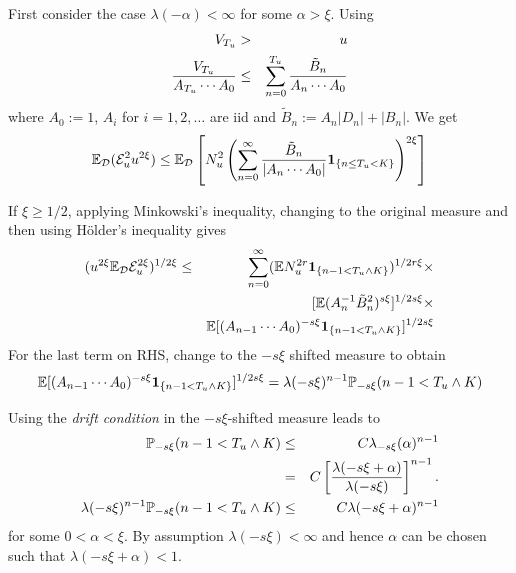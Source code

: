 \documentclass{beamer}
\begin{document}
\begin{frame}
  First consider the case $\lambda(-\alpha) < \infty$ for some $\alpha
  > \xi$. Using
  \begin{eqnarray*}
    V_{T_u} &>& u \\
    {V_{T_u}
      \over
      A_{T_u} \cdots A_0
    } &\leq& \sum_{n=0}^{T_u} {
      \tilde B_n
      \over
      A_n \cdots A_0
    }
  \end{eqnarray*}
  where $A_{0} := 1$, $A_i$ for $i =1, 2, \dots$ are iid and $\tilde B_n :=
  A_n |D_n| + |B_n|$. We get
  \[
  \E_{\mathcal D}(\mathcal E_u^2 u^{2\xi}) \leq
  \E_{\mathcal D} \left[
    N_u^2
    \left(
    \sum_{n=0}^{\infty} {
      \tilde B_n
      \over
      |A_n \cdots A_0|
    }
    \1{n \leq T_u < K}
    \right)^{2\xi}
    \right]
  \]
\end{frame}

\begin{frame}
  If $\xi \geq 1/2$, applying Minkowski's inequality, changing to
  the original measure and then using H\"older's inequality gives
  \begin{eqnarray*}
    (u^{2\xi} \E_{\mathcal D} \mathcal{E}^{2\xi}_u)^{1/2\xi} &\leq&
    \sum_{n=0}^\infty
    (\E N_u^{2r} \1{n-1 < T_u \wedge K})^{1/2r\xi} \times \\
    && [\E (A_n^{-1} \tilde B_n^2)^{s\xi}]^{1/2s\xi} \times \\
    && \E[
    (A_{n-1} \cdots A_0)^{-s\xi}
    \1{n-1 < T_u \wedge K}
    ]^{1/2s\xi}
  \end{eqnarray*}
  For the last term on RHS, change to the $-s\xi$ shifted measure to
  obtain
  \[
  \E[
    (A_{n-1} \cdots A_0)^{-s\xi}
    \1{n-1 < T_u \wedge K}
    ]^{1/2s\xi} = \lambda(-s\xi)^{n-1} \P_{-s\xi}(n-1 < T_u \wedge K)
  \]
\end{frame}

\begin{frame}
  Using the {\it drift condition} in the $-s\xi$-shifted measure leads to
  \begin{eqnarray*}
    \P_{-s\xi}(n-1 < T_u \wedge K) &\leq& C
    \lambda_{-s\xi}(\alpha)^{n-1} \\
    &=& C \left[
      {
      \lambda(-s\xi + \alpha)
      \over
      \lambda(-s\xi)
    }
    \right]^{n-1}. \\
    \lambda(-s\xi)^{n-1} \P_{-s\xi}(n-1 < T_u \wedge K) &\leq& C
    \lambda(-s\xi + \alpha)^{n-1}
  \end{eqnarray*}
  for some $0 < \alpha < \xi$. By assumption $\lambda(-s\xi) < \infty$
  and hence $\alpha$ can be chosen such that $\lambda(-s\xi + \alpha)
  < 1$.
\end{frame}
\end{document}
